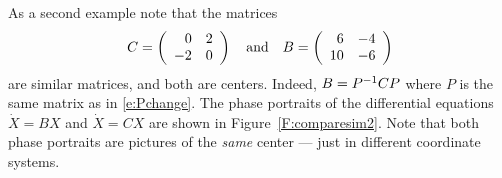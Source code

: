 \documentclass{ximera}
\begin{document}
\begin{figure*}[htb]
        \centerline{%
        }
        \caption{Phase planes for the saddles $\dot{X}=BX$ and $\dot{X}=CX$.}
        \label{F:comparesim}
\end{figure*}

As a second example note that the matrices
\[
C = \left(\begin{array}{rr} 0 & 2\\ -2 &0\end{array}\right) \quad\mbox{and}\quad B = \left(\begin{array}{rr} 6 & -4\\ 10 &-6\end{array}\right)
\]
are similar matrices, and both are centers.   Indeed, $B = P^{-1} CP$
where $P$ is the same matrix as in \eqref{e:Pchange}.  The phase portraits
of the differential equations $\dot{X}=BX$ and $\dot{X}=CX$ are shown in
Figure~\ref{F:comparesim2}.  Note that both phase portraits are pictures
of the {\em same\/} center --- just in different coordinate
systems.



\begin{figure*}[htb]
        \centerline{%
        }
        \caption{Phase planes for the centers $\dot{X}=BX$ and $\dot{X}=CX$.}
        \label{F:comparesim2}
\end{figure*}






\EXER

\end{document}
